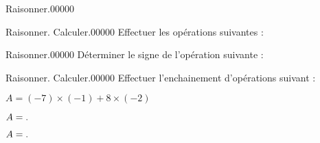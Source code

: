 \documentclass[a4paper,dvipsnames,french,10pt]{book}
\begin{document}
\begin{pageParcoursd}
\begin{ExoCdN}{Raisonner.}{0}{0}{0}{0}{0}
\end{ExoCdN}


\begin{ExoCdN}{Raisonner. Calculer.}{0}{0}{0}{0}{0}
Effectuer les opérations suivantes :\vspace{.2cm}


\end{ExoCdN}

\begin{ExoCdN}{Raisonner.}{0}{0}{0}{0}{0}
Déterminer le signe de l'opération suivante :\vspace{.2cm}

\end{ExoCdN}

\begin{ExoCdN}{Raisonner. Calculer.}{0}{0}{0}{0}{0}
Effectuer l'enchainement d'opérations suivant :

$A=(-7)\times(-1)+8\times(-2)$\vspace{.2cm}

$A=.\dotfill$\vspace{.2cm}

$A=.\dotfill$
\end{ExoCdN}

\end{pageParcoursd} %
\end{document}
